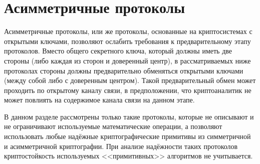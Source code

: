 \section{Асимметричные протоколы}\label{section-protocols-asymmetric}

Асимметричные протоколы, или же протоколы, основанные на криптосистемах с открытыми ключами, позволяют ослабить требования к предварительному этапу протоколов. Вместо общего секретного ключа, который должны иметь две стороны (либо каждая из сторон и доверенный центр), в рассматриваемых ниже протоколах стороны должны предварительно обменяться открытыми ключами (между собой либо с доверенным центром). Такой предварительный обмен может проходить по открытому каналу связи, в предположении, что криптоаналитик не может повлиять на содержимое канала связи на данном этапе.

В данном разделе рассмотрены только такие протоколы, которые не описывают и не ограничивают используемые математические операции, а позволяют использовать любые надёжные криптографические примитивы из симметричной и асимметричной криптографии. При анализе надёжности таких протоколов криптостойкость используемых <<примитивных>> алгоритмов не учитывается.






